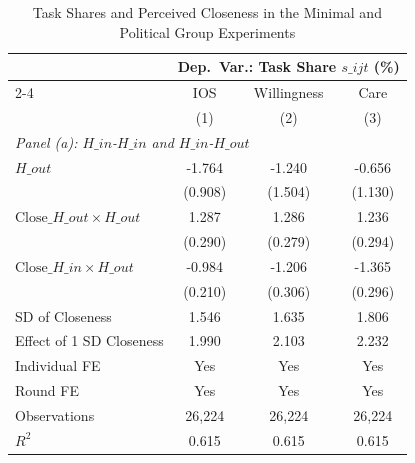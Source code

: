 \begin{table}[H]
\centering
\caption{Task Shares and Perceived Closeness in the Minimal and Political Group Experiments}
\footnotesize
\begin{threeparttable}
\begin{tabular}{l*{3}{c}}
\toprule\toprule
& \multicolumn{3}{c}{Dep.\ Var.: Task Share $s\_{ijt}$ (\%)} \\
\cmidrule(lr){2-4}
& IOS & Willingness & Care \\
& (1) & (2) & (3) \\
\midrule
\multicolumn{4}{l}{\textit{Panel (a): $H\_{in}$-$H\_{in}$ and $H\_{in}$-$H\_{out}$}} \\
\midrule
$H\_{out}$   &      -1.764\sym{*}  &      -1.240         &      -0.656         \\
            &     (0.908)         &     (1.504)         &     (1.130)         \\
\addlinespace
$\text{Close}\_{H\_{out}} \times H\_{out}$&       1.287\sym{***}&       1.286\sym{***}&       1.236\sym{***}\\
            &     (0.290)         &     (0.279)         &     (0.294)         \\
\addlinespace
$\text{Close}\_{H\_{in}} \times H\_{out}$&      -0.984\sym{***}&      -1.206\sym{***}&      -1.365\sym{***}\\
            &     (0.210)         &     (0.306)         &     (0.296)         \\
\midrule
SD of Closeness&       1.546         &       1.635         &       1.806         \\
Effect of 1 SD Closeness&       1.990         &       2.103         &       2.232         \\
Individual FE&         Yes         &         Yes         &         Yes         \\
Round FE    &         Yes         &         Yes         &         Yes         \\
Observations&      26,224         &      26,224         &      26,224         \\
\(R^2\)     &       0.615         &       0.615         &       0.615         \\


\end{tabular}
\end{threeparttable}
\end{table}
